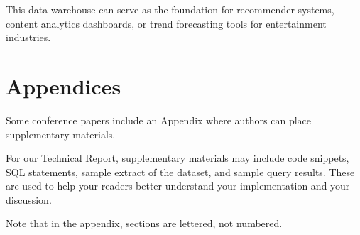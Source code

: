 \documentclass[sigconf, pbalance]{acmart}
\begin{document}
This data warehouse can serve as the foundation for recommender systems, content analytics dashboards, or trend forecasting tools for entertainment industries.






\appendix

\section{Appendices}
Some conference papers include an Appendix where authors can place supplementary materials. 

For our Technical Report, supplementary materials may include code snippets, SQL statements, sample extract of the dataset, and sample query results. These are used to help your readers better understand your implementation and your discussion.

Note that in the appendix, sections are lettered, not numbered. 
\end{document}
